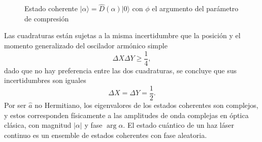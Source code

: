 \begin{figure}[!h]
\begin{tikzpicture}[x=0.75pt,y=0.75pt,yscale=-1,xscale=1]
  \end{tikzpicture}

  \caption{Estado coherente $\vert \alpha \rangle = \hat{D}(\alpha)\vert 0 \rangle$ con $\phi$ el argumento del parámetro de compresión}
  \label{fig:displaced-vacuum}
\end{figure}

Las cuadraturas están sujetas a la misma incertidumbre que la posición y el momento generalizado del oscilador armónico simple
\begin{equation}
  \Delta X \Delta Y \geq \frac{1}{4},
\end{equation}
dado que no hay preferencia entre las dos cuadraturas, se concluye que sus incertidumbres son iguales
\begin{equation}
  \Delta X = \Delta Y = \frac{1}{2}.
\end{equation}
Por ser $\hat{a}$ no Hermitiano, los eigenvalores de los estados coherentes son complejos, y estos corresponden físicamente a las amplitudes de onda complejas en óptica clásica, con magnitud $|\alpha|$ y fase $\arg \alpha$. El estado cuántico de un haz láser continuo es un ensemble de estados coherentes con fase aleatoria.

